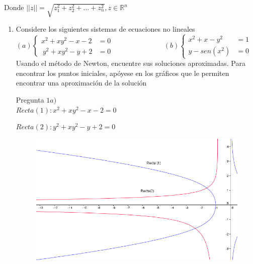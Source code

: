 \documentclass{udparticle}
\begin{document}
        Donde $||z||=\sqrt{z_{1}^{2} + z_{2}^2+...+z_{n}^{2}} , z \in \mathbb{R}^{n}$
    \begin{enumerate}   
        
        \item Considere los siguientes sistemas de ecuaciones no lineales\\
        
        \begin{math}
            (a)\left\lbrace
          \begin{array}{ll}
                x^2 + xy^2-x-2&=0 \\\
                y^2 + xy^2-y+2&=0
            \end{array}
            \right.
            \hspace{3cm}
            (b) \left\lbrace
           \begin{array}{ll}
                 x^2+x-y^2&=1  \\
                 y-sen(x^2)&=0 
            \end{array}
            \right.
        \end{math}\\
        
        Usando el método de Newton, encuentre sus soluciones aproximadas. Para encontrar los puntos iniciales, apóyese en los gráficos que le permiten encontrar una aproximación de la solución 
        
        
        Pregunta $ 1a) $\\
        
            
            $ Recta(1) : x^2+xy^2-x-2=0 $
            
            $ Recta(2) : y^2 +xy^2-y+2=0 $
            
            \begin{figure}[h]
                \centering
                \includegraphics[width=15cm]{GraficoEcEj1a}
            \end{figure}
            

\end{enumerate}
\end{document}
